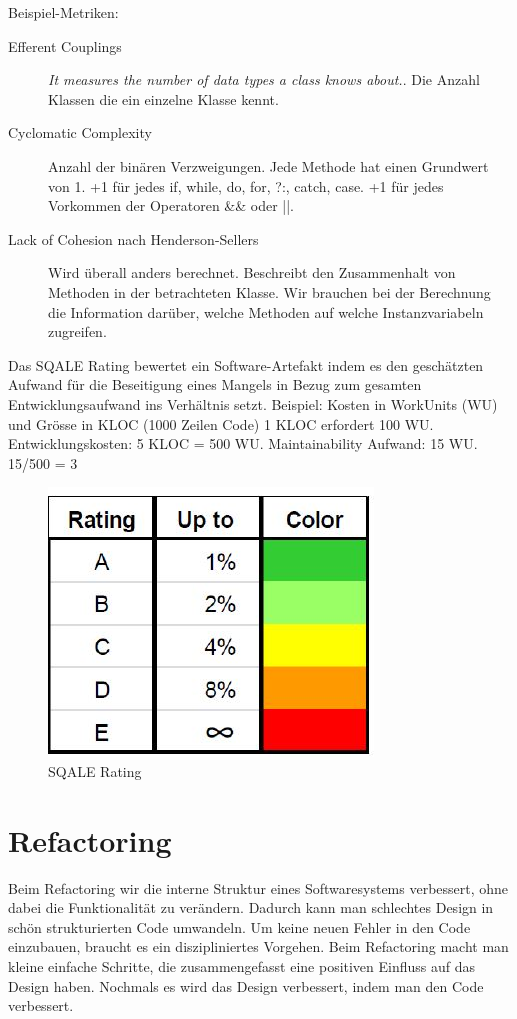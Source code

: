 Beispiel-Metriken:
\begin{description}
	\item[Efferent Couplings] \textit{It measures the number of data types a class knows about.}. Die Anzahl Klassen die ein einzelne Klasse kennt.
	
	\item[Cyclomatic Complexity] Anzahl der binären Verzweigungen. Jede Methode hat einen Grundwert von 1. +1 für jedes if, while, do, for, ?:, catch, case. +1 für jedes Vorkommen der Operatoren \&\& oder ||.
	
	\item[Lack of Cohesion nach Henderson-Sellers] Wird überall anders berechnet. Beschreibt den Zusammenhalt von Methoden in der betrachteten Klasse. Wir brauchen bei der Berechnung die Information darüber, welche Methoden auf welche Instanzvariabeln zugreifen.
\end{description}

Das SQALE Rating bewertet ein Software-Artefakt indem es den geschätzten Aufwand für die Beseitigung eines Mangels in Bezug zum gesamten Entwicklungsaufwand ins Verhältnis setzt. Beispiel: Kosten in WorkUnits (WU) und Grösse in KLOC (1000 Zeilen Code) 1 KLOC erfordert 100 WU. Entwicklungskosten: 5 KLOC = 500 WU. Maintainability Aufwand: 15 WU. 15/500 = 3%

\begin{figure}[h!]
\centering
\includegraphics[width=0.3\linewidth]{fig/sqale-rating}
\caption{SQALE Rating}
\label{fig:sqale-rating}
\end{figure}

\newpage

\section{Refactoring}

Beim Refactoring wir die interne Struktur eines Softwaresystems verbessert, ohne dabei die Funktionalität zu verändern. Dadurch kann man schlechtes Design in schön strukturierten Code umwandeln. Um keine neuen Fehler in den Code einzubauen, braucht es ein diszipliniertes Vorgehen. Beim Refactoring macht man kleine einfache Schritte, die zusammengefasst eine positiven Einfluss auf das Design haben. Nochmals es wird das Design verbessert, indem man den Code verbessert.

